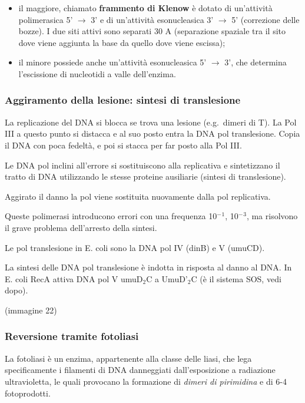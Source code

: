\documentclass[]{article}
\begin{document}
\begin{itemize}
\itemsep1pt\parskip0pt
\item
  il maggiore, chiamato \textbf{frammento di Klenow} è dotato di
  un'attività polimerasica 5' \(\rightarrow\) 3' e di un'attività
  esonucleasica 3' \(\rightarrow\) 5' (correzione delle bozze). I due
  siti attivi sono separati 30 A (separazione spaziale tra il sito dove
  viene aggiunta la base da quello dove viene escissa);
\item
  il minore possiede anche un'attività esonucleasica 5' \(\rightarrow\)
  3', che determina l'escissione di nucleotidi a valle dell'enzima.
\end{itemize}

\subsubsection{Aggiramento della lesione: sintesi di
translesione}\label{aggiramento-della-lesione-sintesi-di-translesione}

La replicazione del DNA si blocca se trova una lesione (e.g.~dimeri di
T). La Pol III a questo punto si distacca e al suo posto entra la DNA
pol translesione. Copia il DNA con poca fedeltà, e poi si stacca per far
posto alla Pol III.

Le DNA pol inclini all'errore si sostituiscono alla replicativa e
sintetizzano il tratto di DNA utilizzando le stesse proteine ausiliarie
(sintesi di translesione).

Aggirato il danno la pol viene sostituita nuovamente dalla pol
replicativa.

Queste polimerasi introducono errori con una frequenza 10\(^-\)\(^1\),
10\(^-\)\(^3\), ma risolvono il grave problema dell'arresto della
sintesi.

Le pol translesione in E. coli sono la DNA pol IV (dinB) e V (umuCD).

La sintesi delle DNA pol translesione è indotta in risposta al danno al
DNA. In E. coli RecA attiva DNA pol V umuD\(_2\)C a UmuD'\(_2\)C (è il
sistema SOS, vedi dopo).

(immagine 22)

\subsubsection{Reversione tramite
fotoliasi}\label{reversione-tramite-fotoliasi}

La fotoliasi è un enzima, appartenente alla classe delle liasi, che lega
specificamente i filamenti di DNA danneggiati dall'esposizione a
radiazione ultravioletta, le quali provocano la formazione di
\emph{dimeri di pirimidina} e di 6-4 fotoprodotti.
\end{document}
